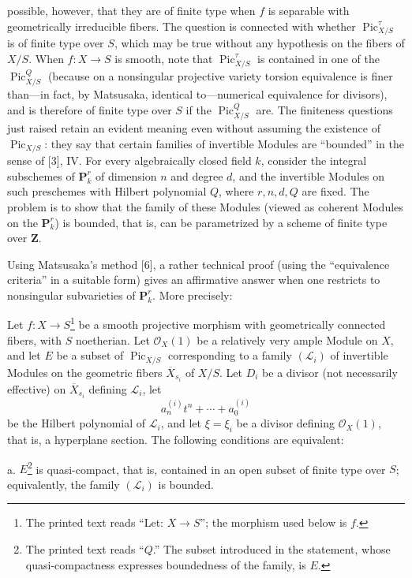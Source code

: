 possible, however, that they are of finite type when $f$ is separable with
geometrically irreducible fibers. The question is connected with whether
$\operatorname{Pic}_{X/S}^\tau$ is of finite type over $S$, which may be true
without any hypothesis on the fibers of $X/S$. When
$f:X\longrightarrow S$ is smooth, note that
$\operatorname{Pic}_{X/S}^\tau$ is contained in one of the
$\operatorname{Pic}_{X/S}^Q$ (because on a nonsingular projective variety
torsion equivalence is finer than—in fact, by Matsusaka, identical to—numerical
equivalence for divisors), and is therefore of finite type over $S$ if the
$\operatorname{Pic}_{X/S}^Q$ are. The finiteness questions just raised retain
an evident meaning even without assuming the existence of
$\operatorname{Pic}_{X/S}$: they say that certain families of invertible
Modules are “bounded” in the sense of [3], IV. For every algebraically closed
field $k$, consider the integral subschemes of $\mathbf P_k^r$ of dimension
$n$ and degree $d$, and the invertible Modules on such preschemes with Hilbert
polynomial $Q$, where $r,n,d,Q$ are fixed. The problem is to show that the
family of these Modules (viewed as coherent Modules on the $\mathbf P_k^r$) is
bounded, that is, can be parametrized by a scheme of finite type over
$\mathbf Z$.

Using Matsusaka's method [6], a rather technical proof (using the “equivalence
criteria” in a suitable form) gives an affirmative answer when one restricts
to nonsingular subvarieties of $\mathbf P_k^r$. More precisely:

 Let $f:X\longrightarrow S$\footnote{The printed text
reads “Let: $X\longrightarrow S$”; the morphism used below is $f$.} be a smooth
projective morphism with geometrically connected fibers, with $S$ noetherian.
Let $\mathcal O_X(1)$ be a relatively very ample Module on $X$, and let $E$ be
a subset of $\operatorname{Pic}_{X/S}$ corresponding to a family
$(\mathcal L_i)$ of invertible Modules on the geometric fibers
$\overline X_{s_i}$ of $X/S$. Let $D_i$ be a divisor (not necessarily
effective) on $\overline X_{s_i}$ defining $\mathcal L_i$, let
\[
a_n^{(i)}t^n+\cdots+a_0^{(i)}
\]
be the Hilbert polynomial of $\mathcal L_i$, and let $\xi=\xi_i$ be a divisor
defining $\mathcal O_X(1)$, that is, a hyperplane section. The following
conditions are equivalent:

\noindent a. $E$\footnote{The printed text reads “$Q$.” The subset introduced
in the statement, whose quasi-compactness expresses boundedness of the family,
is $E$.} is quasi-compact, that is, contained in an open subset of finite type
over $S$; equivalently, the family $(\mathcal L_i)$ is bounded.

